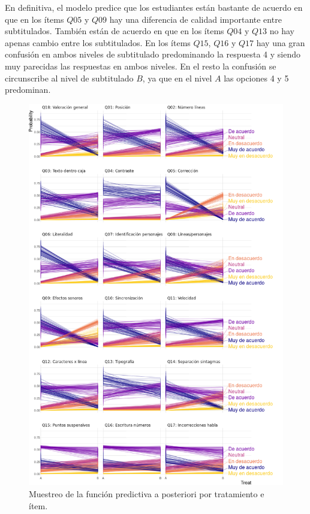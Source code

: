 \documentclass[
  12pt,
  a4paper,
  extrafontsizes,
  onecolumn,
  openright,
  table]{memoir}
\begin{document}
En definitiva, el modelo predice que los estudiantes están bastante de
acuerdo en que en los ítems \(Q05\) y \(Q09\) hay una diferencia de
calidad importante entre subtitulados. También están de acuerdo en que
en los ítems \(Q04\) y \(Q13\) no hay apenas cambio entre los
subtitulados. En los ítems \(Q15\), \(Q16\) y \(Q17\) hay una gran
confusión en ambos niveles de subtitulado predominando la respuesta 4 y
siendo muy parecidas las respuestas en ambos niveles. En el resto la
confusión se circunscribe al nivel de subtitulado \(B\), ya que en el
nivel \(A\) las opciones 4 y 5 predominan.

\begin{figure}[h]

{\centering \includegraphics[width=1.2\textwidth,height=\textheight]{images/bayes-preg.png}

}

\caption{\label{fig-pred-3}Muestreo de la función predictiva a
posteriori por tratamiento e ítem.}

\end{figure}
\end{document}
